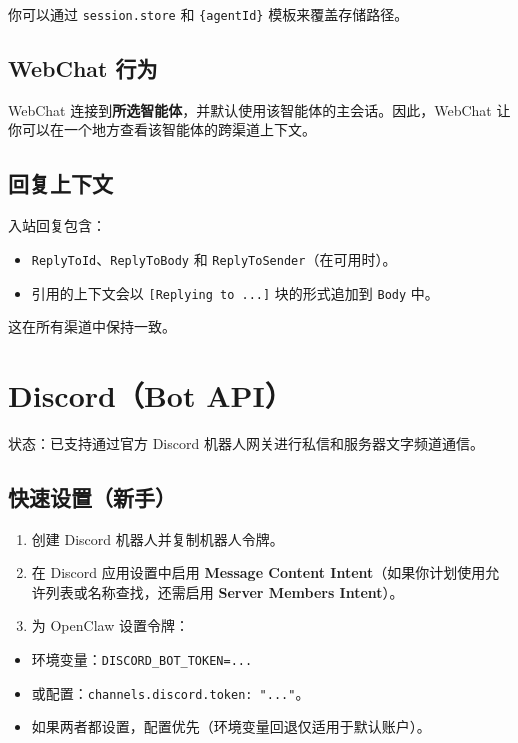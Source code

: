 你可以通过 \texttt{session.store} 和 \texttt{\{agentId\}} 模板来覆盖存储路径。

\subsection{WebChat 行为}


WebChat 连接到\textbf{所选智能体}，并默认使用该智能体的主会话。因此，WebChat 让你可以在一个地方查看该智能体的跨渠道上下文。

\subsection{回复上下文}


入站回复包含：

\begin{itemize}
  \item \texttt{ReplyToId}、\texttt{ReplyToBody} 和 \texttt{ReplyToSender}（在可用时）。
  \item 引用的上下文会以 \texttt{[Replying to ...]} 块的形式追加到 \texttt{Body} 中。
\end{itemize}


这在所有渠道中保持一致。


\clearpage

\section{Discord（Bot API）}


状态：已支持通过官方 Discord 机器人网关进行私信和服务器文字频道通信。

\subsection{快速设置（新手）}


\begin{enumerate}
  \item 创建 Discord 机器人并复制机器人令牌。
  \item 在 Discord 应用设置中启用 \textbf{Message Content Intent}（如果你计划使用允许列表或名称查找，还需启用 \textbf{Server Members Intent}）。
  \item 为 OpenClaw 设置令牌：
\end{enumerate}

\begin{itemize}
  \item 环境变量：\texttt{DISCORD\_BOT\_TOKEN=...}
  \item 或配置：\texttt{channels.discord.token: "..."}。
  \item 如果两者都设置，配置优先（环境变量回退仅适用于默认账户）。
\end{itemize}

